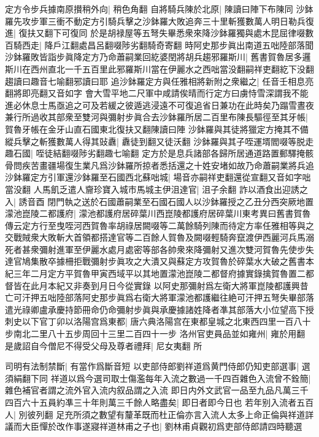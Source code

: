 定方令步兵據南原攅稍外向|{
	稍色角翻}
自將騎兵陳於北原|{
	陳讀曰陣下布陳同}
沙鉢羅先攻步軍三衝不動定方引騎兵擊之沙鉢羅大敗追奔三十里斬獲數萬人明日勒兵復進|{
	復扶又翻下可復同}
於是胡禄屋等五弩失畢悉衆來降沙鉢羅獨與處木昆屈律啜數百騎西走|{
	降戶江翻處昌呂翻啜陟劣翻騎奇寄翻}
時阿史那步眞出南道五咄陸部落聞沙鉢羅敗皆詣步眞降定方乃命蕭嗣業回紇婆閏將胡兵趨邪羅斯川|{
	舊書賀魯居多邏斯川在西州直北一千五百里此邪羅斯川當在伊麗水之西咄當没翻嗣祥吏翻紇下没翻趨讀曰趣音七喻翻邪讀曰耶}
追沙鉢羅定方與任雅相將新附之衆繼之|{
	任音壬相息亮翻將即亮翻又音如字}
會大雪平地二尺軍中咸請俟晴而行定方曰虜恃雪深謂我不能進必休息士馬亟追之可及若緩之彼遁逃浸遠不可復追省日兼功在此時矣乃蹋雪晝夜兼行所過收其部衆至雙河與彌射步眞合去沙鉢羅所居二百里布陳長驅徑至其牙帳|{
	賀魯牙帳在金牙山直石國東北復扶又翻陳讀曰陣}
沙鉢羅與其徒將獵定方掩其不備縱兵擊之斬獲數萬人得其䜴纛|{
	纛徒到翻又徒沃翻}
沙鉢羅與其子咥運壻閻啜等脱走趣石國|{
	咥徒結翻啜陟劣翻趣七喻翻}
定方於是息兵諸部各歸所居通道路置郵驛掩骸骨問疾苦畫疆場復生業凡爲沙鉢羅所掠者悉括還之十姓安堵如故乃命蕭嗣業將兵追沙鉢羅定方引軍還沙鉢羅至石國西北蘇咄城|{
	場音亦嗣祥吏翻還從宣翻又音如字咄當没翻}
人馬飢乏遣人齎珍寶入城市馬城主伊沮達官|{
	沮子余翻}
詐以酒食出迎誘之入|{
	誘音酉}
閉門執之送於石國蕭嗣業至石國石國人以沙鉢羅授之乙丑分西突厥地置濛池崑陵二都護府|{
	濛池都護府居碎葉川西崑陵都護府居碎葉川東考異曰舊書賀魯傳云定方行至曳咥河西賀魯率胡祿居闕啜等二萬餘騎列陳而待定方率任雅相等與之交戰賊衆大敗斬大首領都搭達官等二百餘人賀魯及闕啜輕騎奔竄渡伊西麗河兵馬溺死者甚衆彌射進軍至伊麗水處月處密等部各帥衆來降彌射又進次雙河賀魯先使步失達官鳩集散卒據柵拒戰彌射步眞攻之大潰又與蘇定方攻賀魯於碎葉水大破之舊書本紀三年二月定方平賀魯甲寅西域平以其地置濛池崑陵二都督府據實錄擒賀魯置二都督皆在此月本紀又非奏到月日今從實錄}
以阿史那彌射爲左衛大將軍崑陵都護興昔亡可汗押五咄陸部落阿史那步眞爲右衛大將軍濛池都護繼往絶可汗押五弩失畢部落遣光祿卿盧承慶持節冊命仍命彌射步眞與承慶據諸姓降者凖其部落大小位望高下授刺史以下官丁卯以洛陽宫爲東都|{
	唐六典洛陽宫在東都皇城之北東西四里一百八十步南北二里八十五步周回十三里二百四十一步}
洛州官吏員品並如雍州|{
	雍於用翻}
是歲詔自今僧尼不得受父母及尊者禮拜|{
	尼女夷翻}
所

司明有法制禁斷|{
	有當作爲斷音短}
以吏部侍郎劉祥道爲黄門侍郎仍知吏部選事|{
	選須絹翻下同}
祥道以爲今選司取士傷濫每年入流之數過一千四百雜色入流曾不銓簡|{
	雜色補官者謂之流外官入流内叙品謂之入流}
即日内外文武官一品至九品凡萬三千四百六十五員約凖三十年則萬三千餘人略盡矣|{
	即日者即今日也}
若年别入流者五百人|{
	別彼列翻}
足充所須之數望有釐革既而杜正倫亦言入流人太多上命正倫與祥道詳議而大臣憚於改作事遂寢祥道林甫之子也|{
	劉林甫貞觀初爲吏部侍郎請四時聽選}


